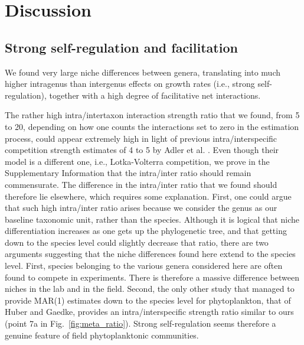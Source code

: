 \documentclass[9pt,twocolumn,twoside,lineno]{pnas-new}
\begin{document}
\section*{Discussion}

\subsection*{Strong self-regulation and facilitation}

We found very large niche differences between genera, translating
into much higher intragenus than intergenus effects on growth rates
(i.e., strong self-regulation), together with a high degree of facilitative
net interactions.

The rather high intra/intertaxon interaction strength ratio\cite{levine_importance_2009}
that we found, from 5 to 20, depending on how one counts the interactions
set to zero in the estimation process, could appear extremely high
in light of previous intra/interspecific competition strength estimates
of 4 to 5 by Adler et al. \cite{adler_competition_2018}. Even
though their model is a different one, i.e., Lotka-Volterra competition,
we prove in the Supplementary Information that the intra/inter ratio
should remain commensurate. The difference in the intra/inter ratio
that we found should therefore lie elsewhere, which requires some
explanation. First, one could argue that such high intra/inter ratio
arises because we consider the genus as our baseline taxonomic unit,
rather than the species. Although it is logical that niche differentiation
increases as one gets up the phylogenetic tree, and that getting down
to the species level could slightly decrease that ratio, there are
two arguments suggesting that the niche differences found here extend
to the species level. First, species belonging to the various genera
considered here are often found to compete in experiments\cite{titman_ecological_1976,tilman_phytoplankton_1982,descamps-julien_stable_2005}.
There is therefore a massive difference between niches in the lab
and in the field\cite{barraquand_coastal_2018}. Second, the
only other study that managed to provide MAR(1) estimates down to
the species level for phytoplankton, that of Huber and Gaedke\cite{huber_role_2006},
provides an intra/interspecific strength ratio similar to ours (point
7a in Fig.~\ref{fig:meta_ratio}). Strong self-regulation seems therefore
a genuine feature of field phytoplanktonic communities.
\end{document}
